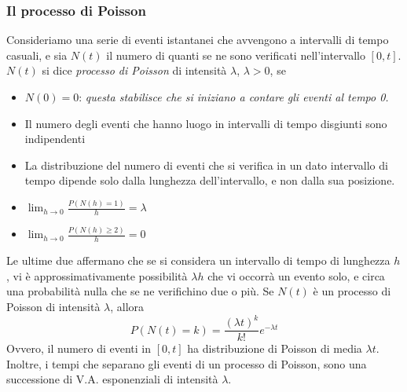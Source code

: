 \documentclass[11pt]{article}
\begin{document}
\subsubsection{Il processo di Poisson}
Consideriamo una serie di eventi istantanei che avvengono a intervalli di tempo casuali, e sia $N(t)$ il numero di quanti se ne sono verificati nell'intervallo $[0,t]$. $N(t)$ si dice \textit{processo di Poisson} di intensità $\lambda$, $\lambda>0$, se
\begin{itemize}
    \item $N(0) = 0$: \textit{questa stabilisce che si iniziano a contare gli eventi al tempo 0.}
    \item Il numero degli eventi che hanno luogo in intervalli di tempo disgiunti sono indipendenti
    \item La distribuzione del numero di eventi che si verifica in un dato intervallo di tempo dipende solo dalla lunghezza dell'intervallo, e non dalla sua posizione.
    \item $\lim_{h\to0}\frac{P(N(h)=1)}{h} = \lambda$
    \item $\lim_{h\to0}\frac{P(N(h)\ge2)}{h} = 0$
\end{itemize}
Le ultime due affermano che se si considera un intervallo di tempo di lunghezza $h$, vi è approssimativamente possibilità $\lambda h$ che vi occorrà un evento solo, e circa una probabilità nulla che se ne verifichino due o più.
Se $N(t)$ è un processo di Poisson di intensità $\lambda$, allora 
\begin{displaymath}
    P(N(t)=k) = \frac{(\lambda t)^k}{k!} e^{-\lambda t}
\end{displaymath}
Ovvero, il numero di eventi in $[0,t]$ ha distribuzione di Poisson di media $\lambda t$. Inoltre, i tempi che separano gli eventi di un processo di Poisson, sono una successione di V.A. esponenziali di intensità $\lambda$.
\end{document}
